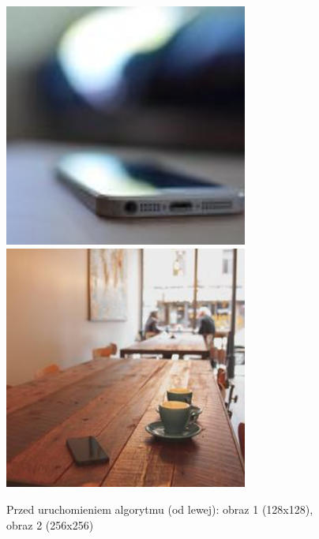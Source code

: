 \documentclass[a4paper,12pt]{book}
\begin{document}
\begin{figure}[H]
	\caption{Przed uruchomieniem algorytmu (od lewej): obraz 1 (128x128), obraz 2 (256x256)}
	\includegraphics[width=8cm, height=8cm]{phone-unmodified.jpg}
	\includegraphics[width=8cm, height=8cm]{coffee-unmodified.jpg}
\end{figure}
\end{document}
